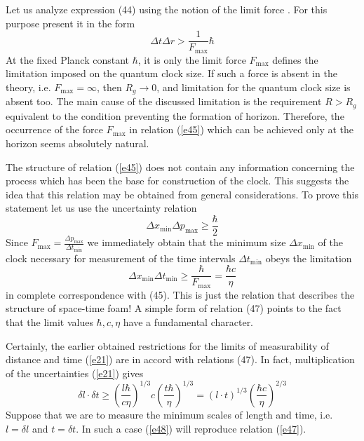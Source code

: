\documentclass [12pt]{article}
\begin{document}
Let us analyze expression (44) using the notion of the limit force \cite{s34}. For this purpose present it in the form
\begin{equation}\label{e45}
  \Delta t\Delta r > \frac{1}{{{F_{\max }}}}\hbar
\end{equation}
At the fixed Planck constant $\hbar$, it is only the limit force ${F_{\max }}$  defines the limitation  imposed on the quantum clock size. If  such a force is absent in the theory, i.e. ${F_{\max }} = \infty $, then ${R_g} \to 0$, and limitation for the quantum clock size is absent too. The main cause of the discussed limitation is the requirement $R > {R_g}$ equivalent to the condition preventing the formation of  horizon. Therefore, the  occurrence of the force  ${F_{\max }}$ in relation (\ref{e45}) which can be achieved only at the horizon seems absolutely natural.

The structure of relation (\ref{e45}) does not contain any information concerning the process  which has been the base for construction of the clock. This suggests the idea that this relation may be obtained from general considerations. To prove this statement let us use the uncertainty relation
\begin{equation}\label{e46}
  \Delta {x_{\min }}\Delta {p_{\max }} \ge \frac{\hbar }{2}
\end{equation}
Since  ${F_{\max }} = \frac{{\Delta {p_{\max }}}}{{\Delta {t_{\min }}}}$ we immediately obtain that the minimum size $\Delta {x_{\min }}$ of the clock necessary for measurement of the time intervals  $\Delta {t_{\min }}$ obeys the limitation
\begin{equation}\label{e47}
  \Delta {x_{\min }}\Delta {t_{\min }} \ge \frac{\hbar }{{{F_{\max }}}} = \frac{{\hbar c}}{\eta }
\end{equation}
in complete correspondence with (45). This is just the relation that describes the structure of space-time foam! A simple form of relation  (47) points to the fact that  the limit values $\hbar ,c,\eta $ have a fundamental character.

Certainly, the earlier obtained restrictions for the limits of measurability of distance and time  (\ref{e21}) are in accord with relations (47). In fact,  multiplication of the uncertainties  (\ref{e21}) gives
\begin{equation}\label{e48}
  \delta l \cdot \delta t \ge {\left( {\frac{{l\hbar }}{{c\eta }}} \right)^{1/3}}c{\left( {\frac{{t\hbar }}{\eta }} \right)^{1/3}} = {\left( {l \cdot t} \right)^{1/3}}{\left( {\frac{{\hbar c}}{\eta }} \right)^{2/3}}
\end{equation}
Suppose that we are to measure the minimum scales of length and time, i.e. $l = \delta l$ and $t = \delta t$. In such a case (\ref{e48}) will reproduce  relation (\ref{e47}).
\end{document}
